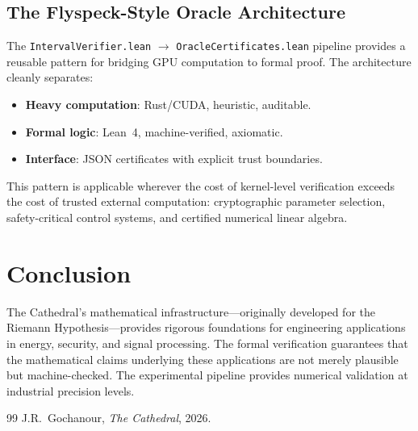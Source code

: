 \documentclass[11pt,a4paper]{article}
\begin{document}
\subsection{The Flyspeck-Style Oracle Architecture}

The \texttt{IntervalVerifier.lean} $\to$ \texttt{OracleCertificates.lean}
pipeline provides a reusable pattern for bridging GPU computation to
formal proof. The architecture cleanly separates:
\begin{itemize}
  \item \textbf{Heavy computation}: Rust/CUDA, heuristic, auditable.
  \item \textbf{Formal logic}: Lean~4, machine-verified, axiomatic.
  \item \textbf{Interface}: JSON certificates with explicit trust
    boundaries.
\end{itemize}
This pattern is applicable wherever the cost of kernel-level
verification exceeds the cost of trusted external computation:
cryptographic parameter selection, safety-critical control systems,
and certified numerical linear algebra.

\section{Conclusion}

The Cathedral's mathematical infrastructure---originally developed
for the Riemann Hypothesis---provides rigorous foundations for
engineering applications in energy, security, and signal processing.
The formal verification guarantees that the mathematical claims
underlying these applications are not merely plausible but
machine-checked. The experimental pipeline provides numerical
validation at industrial precision levels.

\begin{thebibliography}{99}
J.R.~Gochanour, \emph{The Cathedral}, 2026.
\end{thebibliography}
\end{document}
